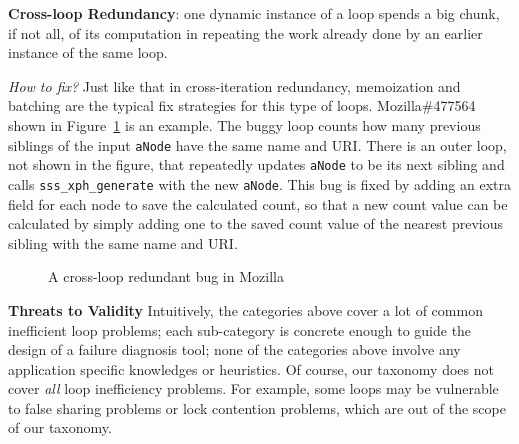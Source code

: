 {\textbf{Cross-loop Redundancy}}:
one dynamic instance of a loop spends a big chunk, if not all, of its
computation in repeating the work already done by an
earlier instance of the same loop.

{\textit{How to fix?}}
Just like that in cross-iteration redundancy, memoization and batching
are the typical fix strategies for this type of loops.
Mozilla\#477564 shown in Figure~\ref{fig:Mozilla477564} is an example. 
The buggy loop counts how many previous siblings of the input \texttt{aNode} have the same name and URI. 
There is an outer loop, not shown in the figure, that repeatedly updates
\texttt{aNode} to be its next sibling and calls
\texttt{sss\_xph\_generate} with the new \texttt{aNode}. 
This bug is fixed by adding an extra field for each node to save the calculated 
count, so that a new count value can be calculated by simply adding one to the
saved count value of the nearest previous sibling with the same name and URI.

\begin{figure}
\centering
{}
  \mbox{}
\caption{A cross-loop redundant bug in Mozilla }
\label{fig:Mozilla477564}
\end{figure}



\noindent\textbf{Threats to Validity}
Intuitively, the categories above cover a lot of common inefficient
loop problems; each sub-category is concrete enough to guide the design of a
failure diagnosis tool; none of the categories above involve any application
specific knowledges or heuristics.
Of course, our taxonomy does not cover \emph{all} loop inefficiency problems.
For example, some loops may be vulnerable to false sharing problems or lock
contention problems, which are out of the scope of our taxonomy. 
